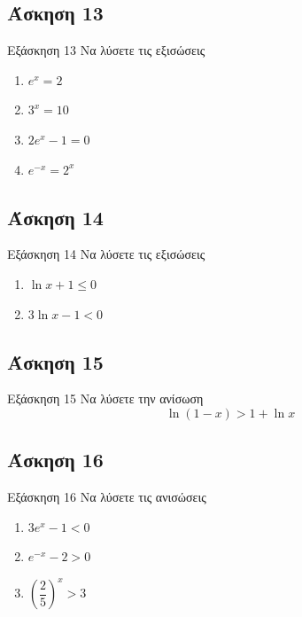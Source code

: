 \documentclass[greek]{beamer}
\begin{document}
\subsection{Άσκηση 13}
\begin{frame}[label=Άσκηση13,t]{Εξάσκηση 13}
  Να λύσετε τις εξισώσεις
  \begin{enumerate}
    \item<1-> $e^x=2$
    \item<2-> $3^x=10$
    \item<3-> $2e^x-1=0$
    \item<4-> $e^{-x}=2^x$
  \end{enumerate}

\end{frame}

\subsection{Άσκηση 14}
\begin{frame}[label=Άσκηση14,t]{Εξάσκηση 14}
  Να λύσετε τις εξισώσεις
  \begin{enumerate}
    \item<1-> $\ln x+1\le 0$
    \item<2-> $3\ln x-1<0$
  \end{enumerate}

\end{frame}

\subsection{Άσκηση 15}
\begin{frame}[label=Άσκηση15,t]{Εξάσκηση 15}
  Να λύσετε την ανίσωση $$\ln (1-x)>1+\ln x$$

\end{frame}

\subsection{Άσκηση 16}
\begin{frame}[label=Άσκηση16,t]{Εξάσκηση 16}
  Να λύσετε τις ανισώσεις
  \begin{enumerate}
    \item<1-> $3e^x-1<0$
    \item<2-> $e^{-x}-2>0$
    \item<3-> $\left( \dfrac{2}{5} \right)^x>3 $
  \end{enumerate}

\end{frame}
\end{document}
